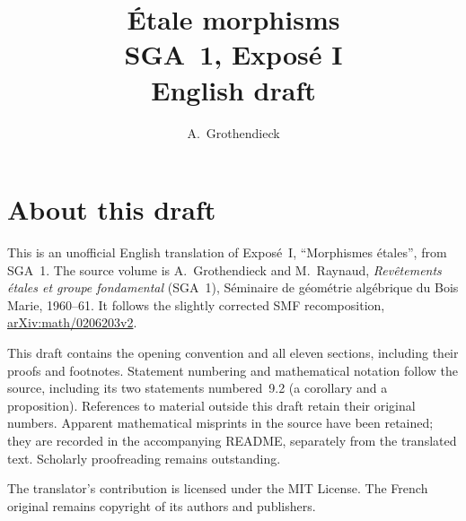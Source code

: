 \documentclass[11pt,a4paper,oneside]{amsbook}
\title[SGA~1, Expos\'e I (English draft)]{\'Etale morphisms\\
{\normalsize SGA~1, Expos\'e I\\English draft}}
\author{A.\ Grothendieck}
\date{}
\theoremstyle{plain}
\theoremstyle{definition}
\theoremstyle{remark}
\begin{document}
\frontmatter
\maketitle

\chapter*{About this draft}
This is an unofficial English translation of Expos\'e~I,
``Morphismes \'etales'', from SGA~1. The source volume is
A.\ Grothendieck and M.\ Raynaud,
\textit{Rev\^etements \'etales et groupe fondamental} (SGA~1),
S\'eminaire de g\'eom\'etrie alg\'ebrique du Bois Marie, 1960--61.
It follows the slightly corrected SMF recomposition,
\href{https://arxiv.org/abs/math/0206203v2}{arXiv:math/0206203v2}.

This draft contains the opening convention and all eleven sections,
including their proofs and footnotes. Statement numbering and
mathematical notation follow the source, including its two statements
numbered~9.2 (a corollary and a proposition).
References to material outside this draft retain their original
numbers. Apparent mathematical misprints in the source have been
retained; they are recorded in the accompanying README, separately
from the translated text. Scholarly proofreading remains outstanding.

The translator's contribution is licensed under
the MIT License.
The French original remains copyright of its authors and publishers.

\tableofcontents
\mainmatter







\end{document}
